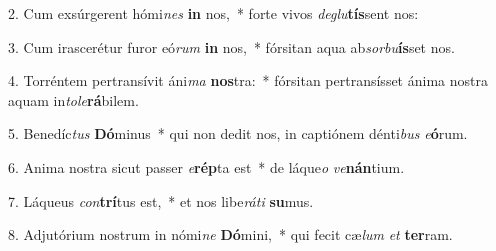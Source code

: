 2. Cum exsúrgerent hómi\textit{nes} \textbf{in} nos,~*  forte vivos \textit{de}\textit{glu}\textbf{tís}sent nos:\

3. Cum irascerétur furor eó\textit{rum} \textbf{in} nos,~*  fórsitan aqua ab\textit{sor}\textit{bu}\textbf{ís}set nos.\

4. Torréntem pertransívit áni\textit{ma} \textbf{nos}tra:~*  fórsitan pertransísset ánima nostra aquam in\textit{to}\textit{le}\textbf{rá}bilem.\

5. Benedíc\textit{tus} \textbf{Dó}minus~*  qui non dedit nos, in captiónem dénti\textit{bus} \textit{e}\textbf{ó}rum.\

6. Anima nostra sicut passer \textit{e}\textbf{rép}ta est~*  de láque\textit{o} \textit{ve}\textbf{nán}tium.\

7. Láqueus \textit{con}\textbf{trí}tus est,~*  et nos libe\textit{rá}\textit{ti} \textbf{su}mus.\

8. Adjutórium nostrum in nómi\textit{ne} \textbf{Dó}mini,~*  qui fecit cæ\textit{lum} \textit{et} \textbf{ter}ram.\

